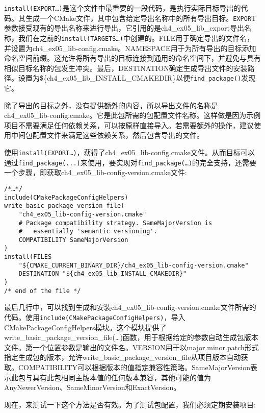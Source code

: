 \texttt{install(EXPORT…)}是这个文件中最重要的一段代码，是执行实际目标导出的代码。其生成一个CMake文件，其中包含给定导出名称中的所有导出目标。\texttt{EXPOR}T参数接受现有的导出名称来进行导出，它引用的是ch4\_ex05\_lib\_export导出名称，我们在之前的\texttt{install(TARGETS…)}中创建的。FILE用于确定导出的文件名，并设置为ch4\_ex05\_lib-config.cmake。NAMESPACE用于为所有导出的目标添加命名空间前缀。这允许将所有导出的目标连接到通用的命名空间下，并避免与具有相似目标名称的包发生冲突。最后，DESTINATION确定生成导出文件的安装路径。设置为\$\{ch4\_ex05\_lib\_INSTALL\_CMAKEDIR\}以便\texttt{find\_package()}发现它。

\begin{tcolorbox}[colback=webgreen!5!white,colframe=webgreen!75!black,title=Note]
除了导出的目标之外，没有提供额外的内容，所以导出文件的名称是ch4\_ex05\_lib-config.cmake。它是此包所需的包配置文件名称。这样做是因为示例项目不需要满足任何依赖关系，可以按原样直接导入。若需要额外的操作，建议使用中间包配置文件来满足这些依赖关系，然后包含导出的文件。
\end{tcolorbox}

使用\texttt{install(EXPORT…)}，获得了ch4\_ex05\_lib-config.cmake文件。从而目标可以通过\texttt{find\_package(...)}来使用，要实现对\texttt{find\_package(…)}的完全支持，还需要一个步骤，即获取ch4\_ex05\_lib-config-version.cmake文件:

\begin{lstlisting}[style=styleCMake]
/*…*/
include(CMakePackageConfigHelpers)
write_basic_package_version_file(
	"ch4_ex05_lib-config-version.cmake"
	# Package compatibility strategy. SameMajorVersion is
	#	essentially 'semantic versioning'.
	COMPATIBILITY SameMajorVersion
)
install(FILES
	"${CMAKE_CURRENT_BINARY_DIR}/ch4_ex05_lib-config-version.cmake"
	DESTINATION "${ch4_ex05_lib_INSTALL_CMAKEDIR}"
)
/* end of the file */
\end{lstlisting}

最后几行中，可以找到生成和安装ch4\_ex05\_lib-config-version.cmake文件所需的代码。使用\texttt{include(CMakePackageConfigHelpers)}，导入CMakePackageConfigHelpers模块。这个模块提供了write\_basic\_package\_version\_file(…)函数，用于根据给定的参数自动生成包版本文件。第一个位置参数是输出的文件名。VERSION用于以major.minor.patch形式指定生成包的版本，允许write\_basic\_package\_version\_file从项目版本自动获取。COMPATIBILITY可以根据版本的值指定兼容性策略。SameMajorVersion表示此包与具有此包相同主版本值的任何版本兼容，其他可能的值为AnyNewerVersion、SameMinorVersion和ExactVersion。

现在，来测试一下这个方法是否有效。为了测试包配置，我们必须定期安装项目:


